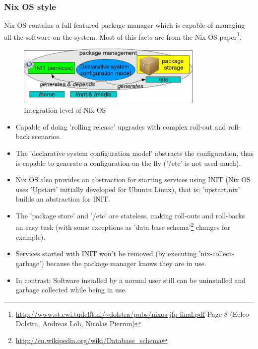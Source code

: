 \documentclass[a4paper,10pt]{article}
\begin{document}
\subsubsection{Nix OS style}
\label{NixOSstyle}
Nix OS contains a full featured package manager which is capable of managing all the software on the system. Most of this facts are from the Nix OS paper\footnote{\url{http://www.st.ewi.tudelft.nl/~dolstra/pubs/nixos-jfp-final.pdf} Page 8 (Eelco Dolstra, Andreas L\"oh, Nicolas Pierron)}.
\begin{figure}[h]
\caption[Kurzeintrag]{Integration level of Nix OS}
  \centering
  \includegraphics[width=90mm]{diagrams/package_management_integration4.png}
\end{figure}
\begin{itemize}
\item Capable of doing 'rolling release' upgrades with complex roll-out and roll-back scenarios.
\item The 'declarative system configuration model' abstracts the configuration, thus is capable to generate a configuration on the fly ('/etc' is not used much). 
\item Nix OS also provides an abstraction for starting services using INIT (Nix OS uses 'Upstart' initially developed for Ubuntu Linux), that is: 'upstart.nix' builds an abstraction for INIT.
\item The 'package store' and '/etc' are stateless, making roll-outs and roll-backs an easy task (with some exceptions as 'data base schema'\footnote{\url{http://en.wikipedia.org/wiki/Database_schema}} changes for example).
\item Services started with INIT won't be removed (by executing 'nix-collect-garbage') because the package manager knows they are in use.
\item In contrast: Software installed by a normal user still can be uninstalled and garbage collected while being in use.
\end{itemize}
\end{document}
